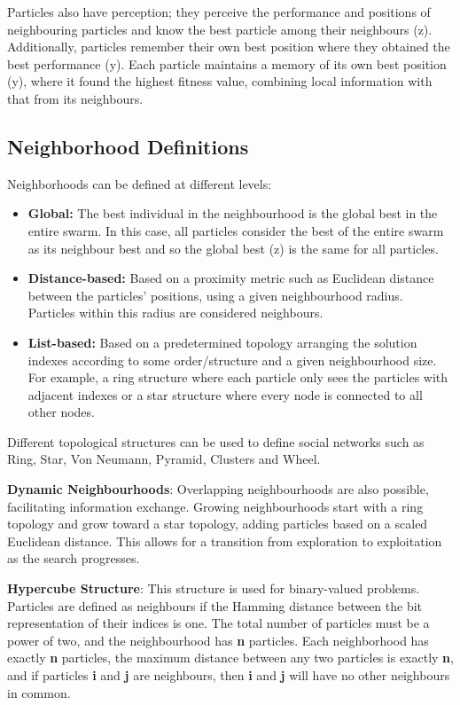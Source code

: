 Particles also have perception; they perceive the performance and positions of neighbouring particles and know the best particle among their neighbours (z). Additionally, particles remember their own best position where they obtained the best performance (y).
Each particle maintains a memory of its own best position (y), where it found the highest fitness value, combining local information with that from its neighbours.

\subsection*{Neighborhood Definitions}
Neighborhoods can be defined at different levels:
\begin{itemize}
    \item \textbf{Global:} The best individual in the neighbourhood is the global best in the entire swarm. In this case, all particles consider the best of the entire swarm as its neighbour best and so the global best (z) is the same for all particles.
    \item \textbf{Distance-based:} Based on a proximity metric such as Euclidean distance between the particles' positions, using a given neighbourhood radius. Particles within this radius are considered neighbours.
    \item \textbf{List-based:} Based on a predetermined topology arranging the solution indexes according to some order/structure and a given neighbourhood size. For example, a ring structure where each particle only sees the particles with adjacent indexes or a star structure where every node is connected to all other nodes.
\end{itemize}
Different topological structures can be used to define social networks such as Ring, Star, Von Neumann, Pyramid, Clusters and Wheel.

\textbf{Dynamic Neighbourhoods}: Overlapping neighbourhoods are also possible, facilitating information exchange. Growing neighbourhoods start with a ring topology and grow toward a star topology, adding particles based on a scaled Euclidean distance. This allows for a transition from exploration to exploitation as the search progresses.

\textbf{Hypercube Structure}: This structure is used for binary-valued problems. Particles are defined as neighbours if the Hamming distance between the bit representation of their indices is one. The total number of particles must be a power of two, and the neighbourhood has \textbf{n} particles. Each neighborhood has exactly \textbf{n} particles, the maximum distance between any two particles is exactly \textbf{n}, and if particles \textbf{i} and \textbf{j} are neighbours, then \textbf{i} and \textbf{j} will have no other neighbours in common.


